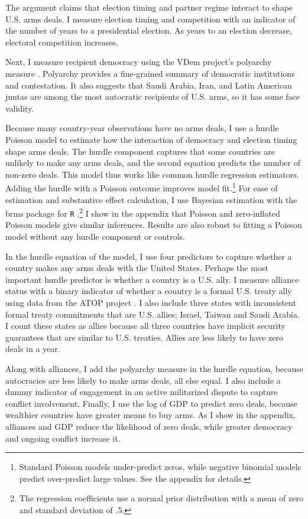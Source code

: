 \documentclass[12pt]{article}
\begin{document}
The argument claims that election timing and partner regime interact to shape U.S. arms deals. 
I measure election timing and competition with an indicator of the number of years to a presidential election. 
As years to an election decrease, electoral competition increases. 


Next, I measure recipient democracy using the VDem project's polyarchy measure \citep{Coppedgeetal2008}. 
Polyarchy provides a fine-grained summary of democratic institutions and contestation.
It also suggests that Saudi Arabia, Iran, and Latin American juntas are among the most autocratic recipients of U.S. arms, so it has some face validity.  


Because many country-year observations have no arms deals, I use a hurdle Poisson model to estimate how the interaction of democracy and election timing shape arms deals.
The hurdle component captures that some countries are unlikely to make any arms deals, and the second equation predicts the number of non-zero deals.
This model thus works like common hurdle regression estimators.  
Adding the hurdle with a Poisson outcome improves model fit.\footnote{Standard Poisson models under-predict zeros, while negative binomial models predict over-predict large values. See the appendix for details.} 
For ease of estimation and substantive effect calculation, I use Bayesian estimation with the brms package for \texttt{R} \citep{Buerkner2017}.\footnote{The regression coefficients use a normal prior distribution with a mean of zero and standard deviation of .5.}
I show in the appendix that Poisson and zero-inflated Poisson models give similar inferences. 
Results are also robust to fitting a Poisson model without any hurdle component or controls.


In the hurdle equation of the model, I use four predictors to capture whether a country makes any arms deals with the United States. 
Perhaps the most important hurdle predictor is whether a country is a U.S. ally. 
I measure alliance status with a binary indicator of whether a country is a formal U.S. treaty ally using data from the ATOP project \citep{Leedsetal2002}.
I also include three states with inconsistent formal treaty commitments that are U.S. allies; Israel, Taiwan and Saudi Arabia. 
I count these states as allies because all three countries have implicit security guarantees that are similar to U.S. treaties.
Allies are less likely to have zero deals in a year.  


Along with alliances, I add the polyarchy measure in the hurdle equation, because autocracies are less likely to make arms deals, all else equal. 
I also include a dummy indicator of engagement in an active militarized dispute to capture conflict involvement. 
Finally, I use the log of GDP to predict zero deals, because wealthier countries have greater means to buy arms.
As I show in the appendix, alliances and GDP reduce the likelihood of zero deals, while greater democracy and ongoing conflict increase it. 
\end{document}
